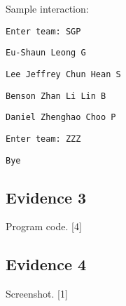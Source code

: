 Sample interaction: 

\texttt{Enter team: SGP }

\texttt{Eu-Shaun Leong G }

\texttt{Lee Jeffrey Chun Hean S }

\texttt{Benson Zhan Li Lin B }

\texttt{Daniel Zhenghao Choo P }

\texttt{Enter team: ZZZ }

\texttt{Bye }

\subsection*{Evidence 3}

Program code. \hfill{} {[}4{]}

\subsection*{Evidence 4 }

Screenshot. \hfill{}{[}1{]}